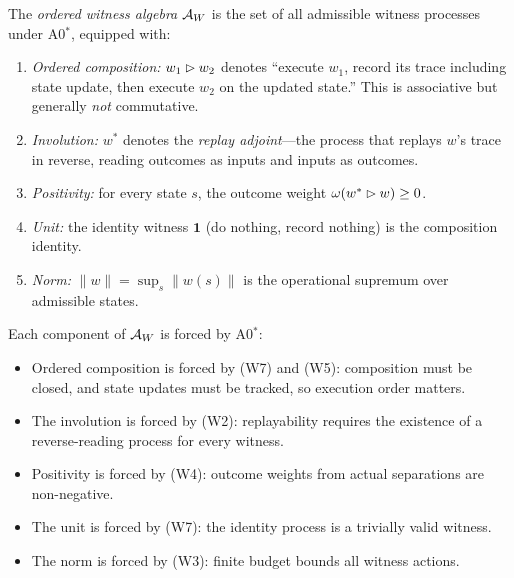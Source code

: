\begin{definition}
\label{def:witness-algebra}
The \emph{ordered witness algebra} $\mathcal{A}_W$ is the set of all admissible
witness processes under A0$^*$, equipped with:
\begin{enumerate}[nosep, label=(\alph*)]
  \item \emph{Ordered composition:} $w_1 \mathbin{\vartriangleright} w_2$ denotes
        ``execute $w_1$, record its trace including state update, then
        execute $w_2$ on the updated state.''  This is associative but
        generally \emph{not} commutative.
  \item \emph{Involution:} $w^*$ denotes the \emph{replay adjoint}---the
        process that replays $w$'s trace in reverse, reading outcomes as
        inputs and inputs as outcomes.
  \item \emph{Positivity:} for every state $s$, the outcome weight
        $\omega(w^* \mathbin{\vartriangleright} w) \geq 0$.
  \item \emph{Unit:} the identity witness $\mathbf{1}$ (do nothing, record
        nothing) is the composition identity.
  \item \emph{Norm:} $\|w\| = \sup_s \|w(s)\|$ is the operational
        supremum over admissible states.
\end{enumerate}
\end{definition}

\begin{proposition}
\label{prop:witness-algebra-forced}
Each component of $\mathcal{A}_W$ is forced by A0$^*$:
\begin{itemize}[nosep]
  \item Ordered composition is forced by (W7) and (W5): composition must
        be closed, and state updates must be tracked, so execution order
        matters.
  \item The involution is forced by (W2): replayability requires the
        existence of a reverse-reading process for every witness.
  \item Positivity is forced by (W4): outcome weights from actual
        separations are non-negative.
  \item The unit is forced by (W7): the identity process is a trivially
        valid witness.
  \item The norm is forced by (W3): finite budget bounds all witness
        actions.
\end{itemize}
\end{proposition}


